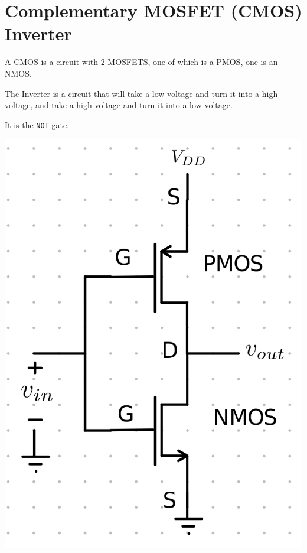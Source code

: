 \documentclass[12pt,letterpaper]{article} \usepackage{amsmath} \usepackage{graphicx} \usepackage[margin=1in]{geometry} \usepackage{longtable}  \usepackage{amssymb}
\begin{document}
	\section{Complementary MOSFET (CMOS) Inverter}
	A CMOS is a circuit with 2 MOSFETS, one of which is a PMOS, one is an NMOS. 
	
	The Inverter is a circuit that will take a low voltage and turn it into a high voltage, and take a high voltage and turn it into a low voltage. 
	
	It is the \verb|NOT| gate.
	\begin{center}
		\includegraphics[width=0.34\linewidth]{cmos}
	\end{center}
	
	
\end{document}
